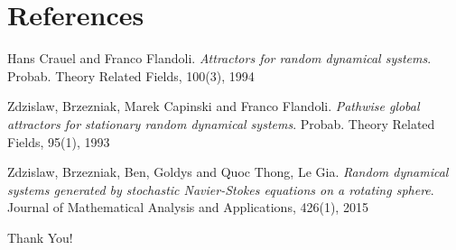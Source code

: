 \documentclass[xcolor=dvipsnames,leqno]{beamer}
\begin{document}
\section{References}

\begin{thebibliography}{9}
Hans Crauel and Franco Flandoli.
\textit{Attractors for random dynamical systems}. 
Probab. Theory Related Fields, 100(3), 1994


Zdzislaw, Brzezniak, Marek Capinski and Franco Flandoli.
\textit{Pathwise global attractors for stationary random dynamical systems}. 
Probab. Theory Related Fields, 95(1), 1993

Zdzislaw, Brzezniak, Ben, Goldys and Quoc Thong, Le Gia.
\textit{Random dynamical systems generated by stochastic {N}avier-{S}tokes equations on a rotating sphere}. 
Journal of Mathematical Analysis and Applications, 426(1), 2015


\end{thebibliography}

\begin{center}
\Huge {\color{Plum}Thank You!}
\end{center}
\end{document}
